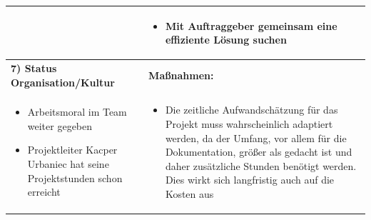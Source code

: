 \begin{center}
\begin{scriptsize}
\begin{tabularx}{\textwidth}{|p{8cm}|X|}
\begin{minipage}{.555\textwidth}
\begin{flushleft}
\begin{itemize}
            \vspace{0.2cm}
    \end{itemize}
    \end{flushleft}
    \end{minipage} &
    \begin{minipage}{.4\textwidth} 
    \begin{flushleft}
        \begin{itemize} \vspace{-0.55cm}  
         \item Mit Auftraggeber gemeinsam eine effiziente Lösung suchen
    \end{itemize}
    \end{flushleft}
    \end{minipage} \\
    \hline
    \textbf{7) Status Organisation/Kultur} & \textbf{Maßnahmen:}\\
    \begin{minipage}{.56\textwidth} 
    \begin{flushleft}
        \begin{itemize} \vspace{-1.3cm}  
         \item Arbeitsmoral im Team weiter gegeben
         \item Projektleiter Kacper Urbaniec hat seine Projektstunden schon erreicht
         \vspace{0.2cm}
    \end{itemize}
    \end{flushleft}
    \end{minipage} &
    \begin{minipage}{.4\textwidth} 
    \begin{flushleft}
        \begin{itemize} \vspace{0cm}  
         \item Die zeitliche Aufwandschätzung für das Projekt muss wahrscheinlich adaptiert werden, da der Umfang, vor allem für die Dokumentation, größer als gedacht ist und daher zusätzliche Stunden benötigt werden. Dies wirkt sich langfristig auch auf die Kosten aus

\end{itemize}
\end{flushleft}
\end{minipage}
\end{tabularx}
\end{scriptsize}
\end{center}
